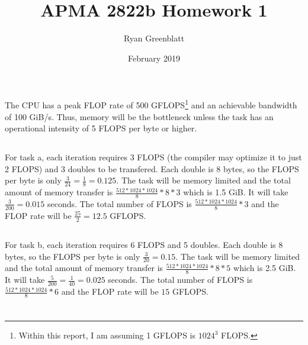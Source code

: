 \documentclass{article}
\title{APMA 2822b Homework 1}
\author{Ryan Greenblatt}
\date{February 2019}
\begin{document}
\setlength\parindent{0pt}

\renewcommand{\thesubsection}{\alph{subsection}}

\maketitle


\section{}

The CPU has a peak FLOP rate of 500 GFLOPS\footnote{Within this report, I am assuming
1 GFLOPS is $1024^3$ FLOPS.} and 
an achievable bandwidth of 100 GiB/s. Thus, memory will
be the bottleneck unless the task has an operational intensity of 5 FLOPS per byte or higher.

\subsection{}

For task a, each iteration requires 3 FLOPS (the compiler may optimize it to just 2 FLOPS) and 3 doubles to
be transfered.
Each double is 8 bytes, so the FLOPS per byte is only $\frac{3}{24} = \frac{1}{8} = 0.125$. The task will 
be memory limited and
the total amount of memory transfer is $\frac{512*1024*1024}{8} * 8 * 3$ which is 1.5 GiB.
It will take $\frac{3}{200} = 0.015$ seconds. The total number of FLOPS is $\frac{512*1024*1024}{8} * 3$ and the
FLOP rate  will be $\frac{25}{2} = 12.5$ GFLOPS.


\subsection{}

For task b, each iteration requires 6 FLOPS and 5 doubles.
Each double is 8 bytes, so the FLOPS per byte is only $\frac{3}{20} = 0.15$. The task will be memory 
limited and
the total amount of memory transfer is $\frac{512*1024*1024}{8} * 8 * 5$ which is 2.5 GiB.
It will take $\frac{5}{200} = \frac{1}{40} = 0.025$ seconds. The total number of FLOPS 
is $\frac{512*1024*1024}{8} * 6$ and the
FLOP rate will be $15$ GFLOPS.

\section{}
\end{document}
